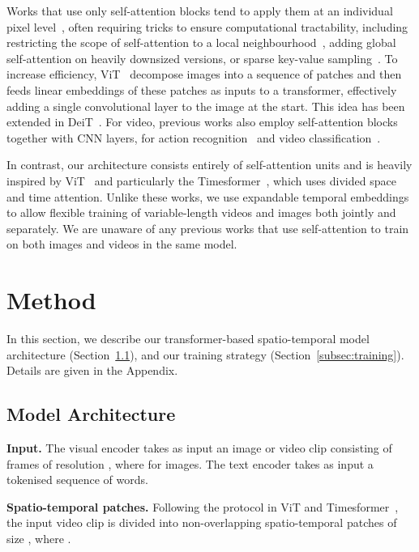 \documentclass[10pt,twocolumn,letterpaper]{article}
\begin{document}
Works that use only self-attention blocks tend to apply them at an individual pixel level~\cite{parmar2018image,ramachandran2019stand,cordonnier2019relationship}, often requiring tricks to ensure computational tractability, including restricting the scope of self-attention to a local neighbourhood~\cite{ramachandran2019stand}, adding global self-attention on heavily downsized versions, or sparse key-value sampling~\cite{child2019generating}. To increase efficiency, ViT~\cite{dosovitskiy2021an} decompose images into a sequence of patches and then feeds linear embeddings of
these patches as inputs to a transformer, effectively adding a single convolutional layer to the image at the start. This idea has been extended in DeiT~\cite{touvron2020deit}. For video, previous works also employ self-attention blocks together with CNN layers, for action recognition~\cite{girdhar2017actionvlad} and video classification~\cite{chen20182}. 

In contrast, our architecture consists entirely of self-attention units and is heavily inspired by ViT~\cite{dosovitskiy2021an} and particularly the Timesformer~\cite{bertasius2021spacetime}, which uses divided space and time attention. Unlike these works, we use expandable temporal embeddings to allow flexible training of variable-length videos and images both jointly and separately. We are unaware of any previous works that use self-attention to train on both images and videos in the same model.


 \section{Method}


In this section, we describe our transformer-based spatio-temporal model architecture
(Section~\ref{subsec:architecture}),
and our training strategy (Section~\ref{subsec:training}).
Details are given in the Appendix.

\subsection{Model Architecture}
\label{subsec:architecture}

\noindent\textbf{Input.} The visual encoder takes as input an image or video clip  consisting of  frames of resolution , where  for images. The text encoder takes as input a tokenised sequence of words.

\noindent\textbf{Spatio-temporal patches.} Following the protocol in ViT and Timesformer~\cite{bertasius2021spacetime}, the input video clip is divided into  non-overlapping spatio-temporal patches of size , where .
\end{document}
